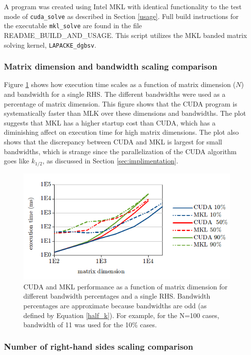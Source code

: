 \documentclass[12pt]{article}
\begin{document}
A program was created using Intel MKL with identical functionality to the test
mode of \texttt{cuda\_solve} as described in Section \ref{usage}. Full build
instructions for the executable \texttt{mkl\_solve} are found in the file
README\_BUILD\_AND\_USAGE. This script utilizes the MKL banded matrix solving kernel,
\texttt{LAPACKE\_dgbsv}.

\subsubsection{Matrix dimension and bandwidth scaling comparison}

Figure \ref{scaling} shows how execution time scales as a function of matrix
dimension ($N$) and bandwidth for a single RHS. The different bandwidths were
used as a percentage of matrix dimension. This figure shows that the CUDA
program is systematically faster than MLK over these dimensions and bandwidths.
The plot suggests that MKL has a higher startup cost than CUDA, which has a
diminishing affect on execution time for high matrix dimensions. The plot also
shows that the discrepancy between CUDA and MKL is largest for small
bandwidths, which is strange since the parallelization of the CUDA algorithm
goes like $k_{1/2}$, as discussed in Section \ref{sec:implimentation}.

\begin{figure}[H]
\caption{CUDA and MKL performance as a function of matrix dimension for different bandwidth percentages and a single RHS. Bandwidth percentages are approximate because bandwidths are odd (as defined by Equation \ref{half_k}). For example, for the N=100 cases, bandwidth of 11 was used for the 10\% cases.}
\label{scaling}
\centerline{\includegraphics[width=12cm]{full_scaling.png}}
\end{figure}

\subsubsection{Number of right-hand sides scaling comparison}
\label{sec:rhs}
\end{document}
